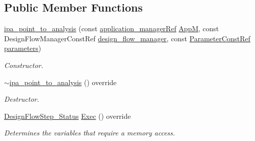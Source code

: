 \subsection*{Public Member Functions}
\begin{DoxyCompactItemize}
\item 
\hyperlink{classipa__point__to__analysis_a288d3060b735d0e6cd1fd24623e7f1c9}{ipa\+\_\+point\+\_\+to\+\_\+analysis} (const \hyperlink{application__manager_8hpp_a04ccad4e5ee401e8934306672082c180}{application\+\_\+manager\+Ref} \hyperlink{classFrontendFlowStep_a0ac0d8db2a378416583f51c4faa59d15}{AppM}, const Design\+Flow\+Manager\+Const\+Ref \hyperlink{classDesignFlowStep_ab770677ddf087613add30024e16a5554}{design\+\_\+flow\+\_\+manager}, const \hyperlink{Parameter_8hpp_a37841774a6fcb479b597fdf8955eb4ea}{Parameter\+Const\+Ref} \hyperlink{classDesignFlowStep_a802eaafe8013df706370679d1a436949}{parameters})
\begin{DoxyCompactList}\small\item\em Constructor. \end{DoxyCompactList}\item 
\hyperlink{classipa__point__to__analysis_a9af2dcc2b52f329b11729242a076d9b5}{$\sim$ipa\+\_\+point\+\_\+to\+\_\+analysis} () override
\begin{DoxyCompactList}\small\item\em Destructor. \end{DoxyCompactList}\item 
\hyperlink{design__flow__step_8hpp_afb1f0d73069c26076b8d31dbc8ebecdf}{Design\+Flow\+Step\+\_\+\+Status} \hyperlink{classipa__point__to__analysis_a9ef230477061e15dd1550e1ca226aa79}{Exec} () override
\begin{DoxyCompactList}\small\item\em Determines the variables that require a memory access. \end{DoxyCompactList}\end{DoxyCompactItemize}
